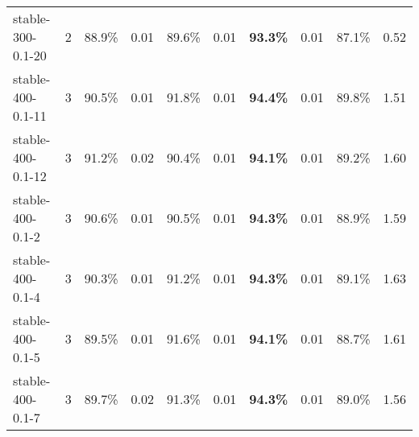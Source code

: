 \documentclass{llncs}
\begin{document}
\begin{table}
\begin{center}
\begin{tabular}{|l|r|c|c|c|c|c|c|c|c|}
stable-300-0.1-20        & 2    & 88.9\% & 0.01 & 89.6\% & 0.01 & \textbf{93.3\%} & 0.01 & 87.1\% & 0.52 \\
stable-400-0.1-11        & 3    & 90.5\% & 0.01 & 91.8\% & 0.01 & \textbf{94.4\%} & 0.01 & 89.8\% & 1.51 \\
stable-400-0.1-12        & 3    & 91.2\% & 0.02 & 90.4\% & 0.01 & \textbf{94.1\%} & 0.01 & 89.2\% & 1.60 \\
stable-400-0.1-2         & 3    & 90.6\% & 0.01 & 90.5\% & 0.01 & \textbf{94.3\%} & 0.01 & 88.9\% & 1.59 \\
stable-400-0.1-4         & 3    & 90.3\% & 0.01 & 91.2\% & 0.01 & \textbf{94.3\%} & 0.01 & 89.1\% & 1.63 \\
stable-400-0.1-5         & 3    & 89.5\% & 0.01 & 91.6\% & 0.01 & \textbf{94.1\%} & 0.01 & 88.7\% & 1.61 \\
stable-400-0.1-7         & 3    & 89.7\% & 0.02 & 91.3\% & 0.01 & \textbf{94.3\%} & 0.01 & 89.0\% & 1.56 \\

 \hline
\end{tabular}
\end{center}
\end{table}
\end{document}
